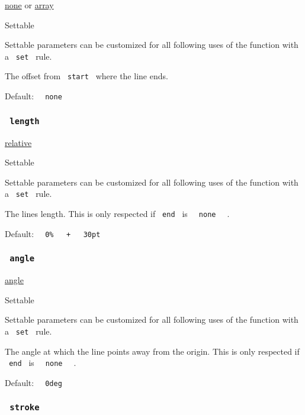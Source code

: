 \href{/docs/reference/foundations/none/}{none} {or}
\href{/docs/reference/foundations/array/}{array}

{{ Settable }}

\label{parameters-end-settable-tooltip}
Settable parameters can be customized for all following uses of the
function with a \texttt{\ set\ } rule.

The offset from \texttt{\ start\ } where the line ends.

Default: \texttt{\ }{\texttt{\ none\ }}\texttt{\ }

\subsubsection{\texorpdfstring{\texttt{\ length\ }}{ length }}\label{parameters-length}

\href{/docs/reference/layout/relative/}{relative}

{{ Settable }}

\label{parameters-length-settable-tooltip}
Settable parameters can be customized for all following uses of the
function with a \texttt{\ set\ } rule.

The line\textquotesingle s length. This is only respected if
\texttt{\ end\ } is \texttt{\ }{\texttt{\ none\ }}\texttt{\ } .

Default:
\texttt{\ }{\texttt{\ 0\%\ }}\texttt{\ }{\texttt{\ +\ }}\texttt{\ }{\texttt{\ 30pt\ }}\texttt{\ }

\subsubsection{\texorpdfstring{\texttt{\ angle\ }}{ angle }}\label{parameters-angle}

\href{/docs/reference/layout/angle/}{angle}

{{ Settable }}

\label{parameters-angle-settable-tooltip}
Settable parameters can be customized for all following uses of the
function with a \texttt{\ set\ } rule.

The angle at which the line points away from the origin. This is only
respected if \texttt{\ end\ } is
\texttt{\ }{\texttt{\ none\ }}\texttt{\ } .

Default: \texttt{\ }{\texttt{\ 0deg\ }}\texttt{\ }

\subsubsection{\texorpdfstring{\texttt{\ stroke\ }}{ stroke }}\label{parameters-stroke}

